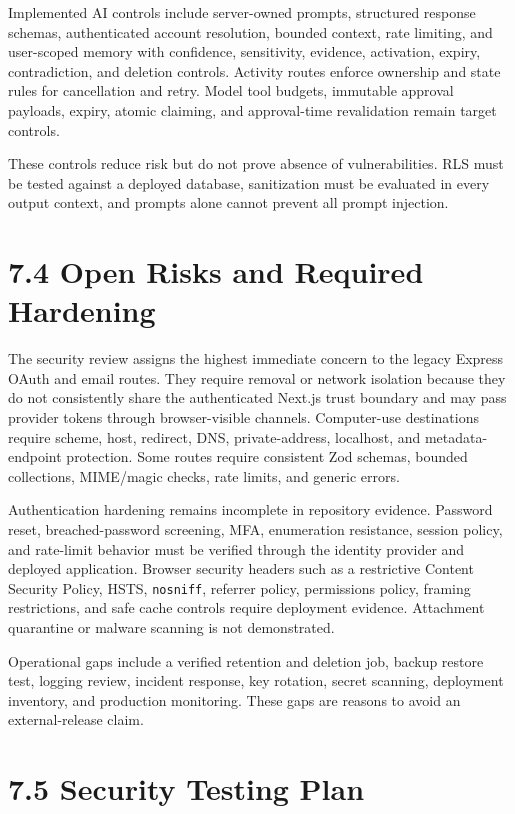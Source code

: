\documentclass[
]{report}
\begin{document}
Implemented AI controls include server-owned prompts, structured
response schemas, authenticated account resolution, bounded context,
rate limiting, and user-scoped memory with confidence, sensitivity,
evidence, activation, expiry, contradiction, and deletion controls.
Activity routes enforce ownership and state rules for cancellation and
retry. Model tool budgets, immutable approval payloads, expiry, atomic
claiming, and approval-time revalidation remain target controls.

These controls reduce risk but do not prove absence of vulnerabilities.
RLS must be tested against a deployed database, sanitization must be
evaluated in every output context, and prompts alone cannot prevent all
prompt injection.

\section{7.4 Open Risks and Required
Hardening}\label{74-open-risks-and-required-hardening}

The security review assigns the highest immediate concern to the legacy
Express OAuth and email routes. They require removal or network
isolation because they do not consistently share the authenticated
Next.js trust boundary and may pass provider tokens through
browser-visible channels. Computer-use destinations require scheme,
host, redirect, DNS, private-address, localhost, and metadata-endpoint
protection. Some routes require consistent Zod schemas, bounded
collections, MIME/magic checks, rate limits, and generic errors.

Authentication hardening remains incomplete in repository evidence.
Password reset, breached-password screening, MFA, enumeration
resistance, session policy, and rate-limit behavior must be verified
through the identity provider and deployed application. Browser security
headers such as a restrictive Content Security Policy, HSTS,
\texttt{nosniff}, referrer policy, permissions policy, framing
restrictions, and safe cache controls require deployment evidence.
Attachment quarantine or malware scanning is not demonstrated.

Operational gaps include a verified retention and deletion job, backup
restore test, logging review, incident response, key rotation, secret
scanning, deployment inventory, and production monitoring. These gaps
are reasons to avoid an external-release claim.

\section{7.5 Security Testing Plan}\label{75-security-testing-plan}
\end{document}

